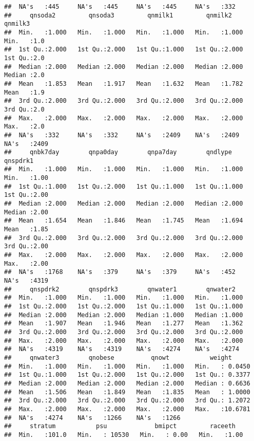 \documentclass[
]{article}
\begin{document}
\begin{verbatim}
##  NA's   :445     NA's   :445     NA's   :445     NA's   :332    
##     qnsoda2         qnsoda3         qnmilk1         qnmilk2         qnmilk3    
##  Min.   :1.000   Min.   :1.000   Min.   :1.000   Min.   :1.000   Min.   :1.0   
##  1st Qu.:2.000   1st Qu.:2.000   1st Qu.:1.000   1st Qu.:2.000   1st Qu.:2.0   
##  Median :2.000   Median :2.000   Median :2.000   Median :2.000   Median :2.0   
##  Mean   :1.853   Mean   :1.917   Mean   :1.632   Mean   :1.782   Mean   :1.9   
##  3rd Qu.:2.000   3rd Qu.:2.000   3rd Qu.:2.000   3rd Qu.:2.000   3rd Qu.:2.0   
##  Max.   :2.000   Max.   :2.000   Max.   :2.000   Max.   :2.000   Max.   :2.0   
##  NA's   :332     NA's   :332     NA's   :2409    NA's   :2409    NA's   :2409  
##     qnbk7day        qnpa0day        qnpa7day        qndlype         qnspdrk1   
##  Min.   :1.000   Min.   :1.000   Min.   :1.000   Min.   :1.000   Min.   :1.00  
##  1st Qu.:1.000   1st Qu.:2.000   1st Qu.:1.000   1st Qu.:1.000   1st Qu.:2.00  
##  Median :2.000   Median :2.000   Median :2.000   Median :2.000   Median :2.00  
##  Mean   :1.654   Mean   :1.846   Mean   :1.745   Mean   :1.694   Mean   :1.85  
##  3rd Qu.:2.000   3rd Qu.:2.000   3rd Qu.:2.000   3rd Qu.:2.000   3rd Qu.:2.00  
##  Max.   :2.000   Max.   :2.000   Max.   :2.000   Max.   :2.000   Max.   :2.00  
##  NA's   :1768    NA's   :379     NA's   :379     NA's   :452     NA's   :4319  
##     qnspdrk2        qnspdrk3        qnwater1        qnwater2    
##  Min.   :1.000   Min.   :1.000   Min.   :1.000   Min.   :1.000  
##  1st Qu.:2.000   1st Qu.:2.000   1st Qu.:1.000   1st Qu.:1.000  
##  Median :2.000   Median :2.000   Median :1.000   Median :1.000  
##  Mean   :1.907   Mean   :1.946   Mean   :1.277   Mean   :1.362  
##  3rd Qu.:2.000   3rd Qu.:2.000   3rd Qu.:2.000   3rd Qu.:2.000  
##  Max.   :2.000   Max.   :2.000   Max.   :2.000   Max.   :2.000  
##  NA's   :4319    NA's   :4319    NA's   :4274    NA's   :4274   
##     qnwater3        qnobese          qnowt           weight       
##  Min.   :1.000   Min.   :1.000   Min.   :1.000   Min.   : 0.0450  
##  1st Qu.:1.000   1st Qu.:2.000   1st Qu.:2.000   1st Qu.: 0.3377  
##  Median :2.000   Median :2.000   Median :2.000   Median : 0.6636  
##  Mean   :1.506   Mean   :1.849   Mean   :1.835   Mean   : 1.0000  
##  3rd Qu.:2.000   3rd Qu.:2.000   3rd Qu.:2.000   3rd Qu.: 1.2072  
##  Max.   :2.000   Max.   :2.000   Max.   :2.000   Max.   :10.6781  
##  NA's   :4274    NA's   :1266    NA's   :1266                     
##     stratum           psu             bmipct         raceeth    
##  Min.   :101.0   Min.   : 10530   Min.   : 0.00   Min.   :1.00  

\end{verbatim}
\end{document}
